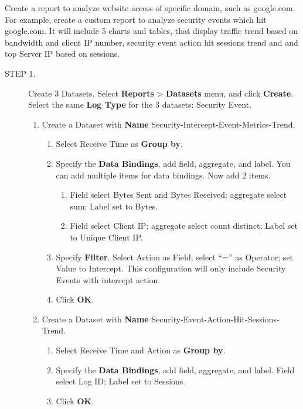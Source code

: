 Create a report to analyze website access of specific domain, such as google.com. For example, create a custom report to analyze security events which hit google.com. It will include 5 charts and tables, that display traffic trend based on bandwidth and client IP number, security event action hit sessions trend and and top Server IP based on sessions.

\begin{description}
    \item[STEP 1.]	Create 3 Datasets. Select \textbf{Reports} > \textbf{Datasets} menu, and click \textbf{Create}. Select the same \textbf{Log Type} for the 3 datasets: Security Event.
    \begin{enumerate}
        \item Create a Dataset with \textbf{Name} Security-Intercept-Event-Metrics-Trend.
        \begin{enumerate}
            \item 	Select Receive Time as \textbf{Group by}. 
            \item 	Specify the \textbf{Data Bindings}, add field, aggregate, and label. You can add multiple items for data bindings. Now add 2 items. 
            \begin{enumerate}
                \item	Field select Bytes Sent and Bytes Received; aggregate select sum; Label set to Bytes. 
                \item	Field select Client IP; aggregate select count distinct; Label set to Unique Client IP. 
            \end{enumerate}
            \item 	Specify \textbf{Filter}. Select Action as Field; select “=” as Operator; set Value to Intercept. This configuration will only include Security Events with intercept action. 
            \item 	Click \textbf{OK}.
        \end{enumerate}
        \item Create a Dataset with \textbf{Name} Security-Event-Action-Hit-Sessions-Trend.
        \begin{enumerate}
            \item 	Select Receive Time and Action as \textbf{Group by}. 
            \item 	Specify the \textbf{Data Bindings}, add field, aggregate, and label. Field select Log ID; Label set to Sessions. 
            \item 	Click \textbf{OK}.

\end{enumerate}
\end{enumerate}
\end{description}
